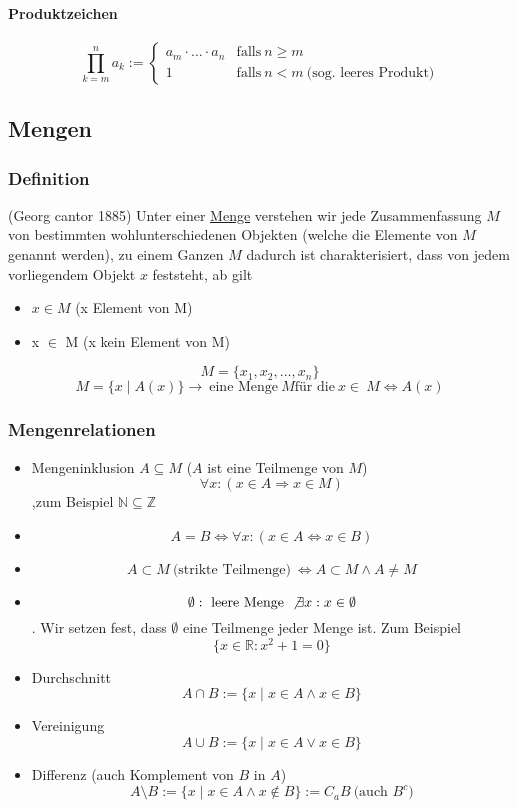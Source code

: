 \documentclass[a4paper]{scrartcl}
\DeclareMathOperator{\Forall}{\forall}%
\begin{document}
\paragraph{Produktzeichen}
\label{sec-2-1-4-2}
\[\prod_{k=m}^n a_k := \begin{cases} a_m \cdot ... \cdot a_n & \text{falls}~n\geq m\\ 1 & \text{falls}~n<m~\text{(sog. leeres Produkt)}\end{cases}\]
\subsection{Mengen}
\label{sec-2-2}
\subsubsection{Definition}
\label{sec-2-2-1}
(Georg cantor 1885) Unter einer \uline{Menge} verstehen wir jede Zusammenfassung $M$ von bestimmten wohlunterschiedenen Objekten (welche die Elemente von $M$ genannt werden), zu einem Ganzen
$M$ dadurch ist charakterisiert, dass von jedem vorliegendem Objekt $x$ feststeht, ab gilt
\begin{itemize}
\item $x\in M$ (x Element von M)
\item x \textlnot{}$\in$ M (x kein Element von M)
\end{itemize}
\[M = \{x_1, x_2, \ldots, x_n\}\]
\[M=\{x\mid A(x)\} \rightarrow~\text{eine Menge}~M\text{für die}~x\in\ M \Leftrightarrow A(x)\]
\subsubsection{Mengenrelationen}
\label{sec-2-2-2}
\begin{itemize}
\item Mengeninklusion $A\subseteq M$ ($A$ ist eine Teilmenge von $M$)
\[\Forall x: (x\in A \Rightarrow x\in M)\] ,zum Beispiel $\mathbb{N} \subseteq \mathbb{Z}$
\item \[A = B \Leftrightarrow \Forall x: (x\in A \Leftrightarrow x\in B)\]
\item \[A \subset M~\text{(strikte Teilmenge)}~\Leftrightarrow A\subset M \wedge A \neq M\]
\item \[\emptyset:~\text{leere Menge}~\not\exists x: x\in\emptyset\]. Wir setzen fest, dass $\emptyset$ eine Teilmenge jeder Menge ist. Zum Beispiel \[\{x\in\mathbb{R}: x^2 + 1 = 0\}\]
\item Durchschnitt \[A\cap B := \{x\mid x\in A \wedge x\in B\}\]
\item Vereinigung \[A\cup B := \{x \mid x\in A \vee x\in B\}\]
\item Differenz (auch Komplement von $B$ in $A$) \[A\setminus B := \{x\mid x\in A \wedge x\not\in B\} := C_a B~\text{(auch $B^c$)}\]
\end{itemize}
\end{document}
